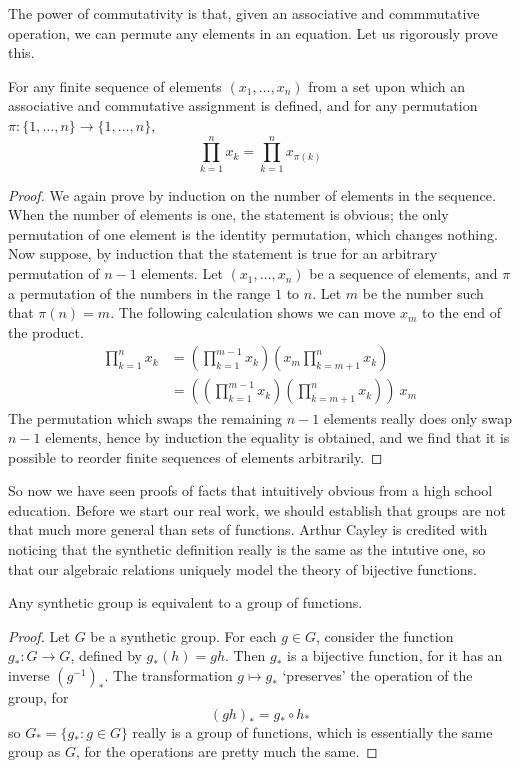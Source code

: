 The power of commutativity is that, given an associative and commmutative operation, we can permute any elements in an equation. Let us rigorously prove this.

\begin{theorem}
    For any finite sequence of elements $(x_1, \dots, x_n)$ from a set upon which an associative and commutative assignment is defined, and for any permutation $\pi: \{ 1, \dots, n \} \to \{ 1, \dots, n \}$,
    \[ \prod_{k=1}^n x_k = \prod_{k=1}^n x_{\pi(k)} \]
\end{theorem}
\begin{proof}
    We again prove by induction on the number of elements in the sequence. When the number of elements is one, the statement is obvious; the only permutation of one element is the identity permutation, which changes nothing. Now suppose, by induction that the statement is true for an arbitrary permutation of $n-1$ elements. Let $(x_1, \dots, x_n)$ be a sequence of elements, and $\pi$ a permutation of the numbers in the range $1$ to $n$. Let $m$ be the number such that $\pi(n) = m$. The following calculation shows we can move $x_m$ to the end of the product.
    \begin{align}
    \prod_{k=1}^n x_k &= \left( \prod_{k=1}^{m-1} x_k \right) \left( x_m \prod_{k=m+1}^n x_k \right)\\
    &= \left( \left( \prod_{k=1}^{m-1} x_k \right) \left( \prod_{k=m+1}^n x_k \right) \right)\ x_m
    \end{align}
    The permutation which swaps the remaining $n-1$ elements really does only swap $n-1$ elements, hence by induction the equality is obtained, and we find that it is possible to reorder finite sequences of elements arbitrarily.
\end{proof}

So now we have seen proofs of facts that intuitively obvious from a high school education. Before we start our real work, we should establish that groups are not that much more general than sets of functions. Arthur Cayley is credited with noticing that the synthetic definition really is the same as the intutive one, so that our algebraic relations uniquely model the theory of bijective functions.

\begin{theorem}
    Any synthetic group is equivalent to a group of functions.
\end{theorem}
\begin{proof}
    Let $G$ be a synthetic group. For each $g \in G$, consider the function $g_*:G \to G$, defined by $g_*(h) = gh$. Then $g_*$ is a bijective function, for it has an inverse $(g^{-1})_*$. The transformation $g \mapsto g_*$ `preserves' the operation of the group, for
    \[ (gh)_* = g_* \circ h_* \]
    so $G_* = \{ g_* : g \in G \}$ really is a group of functions, which is essentially the same group as $G$, for the operations are pretty much the same.
\end{proof}

